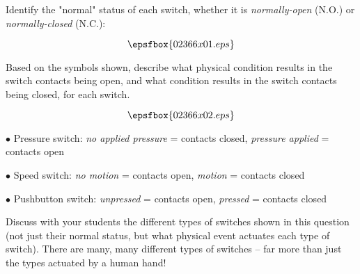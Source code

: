 

Identify the "normal" status of each switch, whether it is {\it normally-open} (N.O.) or {\it normally-closed} (N.C.):

$$\epsfbox{02366x01.eps}$$

Based on the symbols shown, describe what physical condition results in the switch contacts being open, and what condition results in the switch contacts being closed, for each switch.







$$\epsfbox{02366x02.eps}$$

\medskip
\item{$\bullet$} Pressure switch: {\it no applied pressure} = contacts closed, {\it pressure applied} = contacts open
\item{$\bullet$} Speed switch: {\it no motion} = contacts open, {\it motion} = contacts closed
\item{$\bullet$} Pushbutton switch: {\it unpressed} = contacts open, {\it pressed} = contacts closed
\medskip







Discuss with your students the different types of switches shown in this question (not just their normal status, but what physical event actuates each type of switch).  There are many, many different types of switches -- far more than just the types actuated by a human hand!




